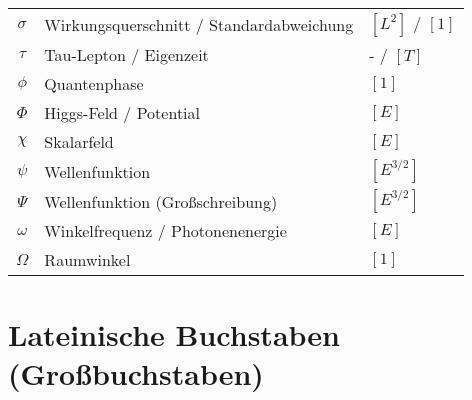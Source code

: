 \documentclass[12pt,a4paper]{report}
\begin{document}
\begin{longtable}{|c|l|l|}
		$\sigma$ & Wirkungsquerschnitt / Standardabweichung & $[L^2]$ / $[1]$ \\
		$\tau$ & Tau-Lepton / Eigenzeit & - / $[T]$ \\
		$\phi$ & Quantenphase & $[1]$ \\
		$\Phi$ & Higgs-Feld / Potential & $[E]$ \\
		$\chi$ & Skalarfeld & $[E]$ \\
		$\psi$ & Wellenfunktion & $[E^{3/2}]$ \\
		$\Psi$ & Wellenfunktion (Großschreibung) & $[E^{3/2}]$ \\
		$\omega$ & Winkelfrequenz / Photonenenergie & $[E]$ \\
		$\Omega$ & Raumwinkel & $[1]$ \\
		\hline
	\end{longtable}
	
	\section{Lateinische Buchstaben (Großbuchstaben)}
	\label{sec:latin_capitals}
	
\end{document}
